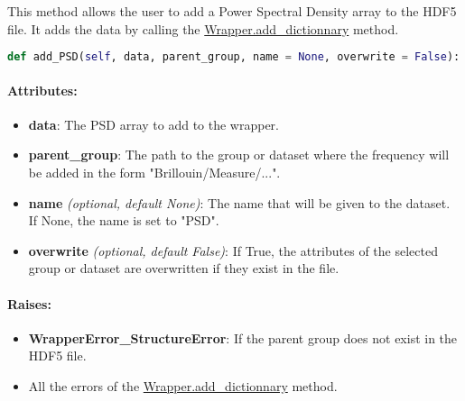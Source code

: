 This method allows the user to add a Power Spectral Density array to the HDF5 file. It adds the data by calling the \hyperref[subsec:wrapper.add_dictionnary]{Wrapper.add\_dictionnary} method.

\begin{lstlisting}[language=Python]
def add_PSD(self, data, parent_group, name = None, overwrite = False):
\end{lstlisting}

\paragraph{Attributes:}

\begin{itemize}
    \item \textbf{data}: The PSD array to add to the wrapper. 
    \item \textbf{parent\_group}: The path to the group or dataset where the frequency will be added in the form "Brillouin/Measure/...".
    \item \textbf{name} \textit{(optional, default None)}: The name that will be given to the dataset. If None, the name is set to "PSD".
    \item \textbf{overwrite} \textit{(optional, default False)}: If True, the attributes of the selected group or dataset are overwritten if they exist in the file.
\end{itemize}

\paragraph{Raises:}
\begin{itemize}
    \item \textbf{WrapperError\_StructureError}: If the parent group does not exist in the HDF5 file.
    \item All the errors of the \hyperref[subsec:wrapper.add_dictionnary]{Wrapper.add\_dictionnary} method.
\end{itemize}
